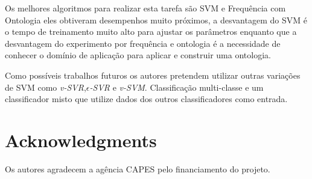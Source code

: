 \documentclass{acm_proc_article-sp}
\begin{document}
Os melhores algoritmos para realizar esta tarefa s{\~a}o SVM e Frequ{\^e}ncia com Ontologia eles obtiveram desempenhos muito pr{\'o}ximos, a desvantagem do SVM {\'e} o tempo de treinamento muito alto para ajustar os par{\^a}metros enquanto que a desvantagem do experimento por frequ{\^e}ncia e ontologia {\'e} a necessidade de conhecer o dom{\'i}nio de aplica\c{c}{\~a}o para aplicar e construir uma ontologia.

Como poss{\'i}veis trabalhos futuros os autores pretendem utilizar outras variações de SVM como \emph{v-SVR},\emph{\(\epsilon\)-SVR} e \emph{v-SVM}. Classifica\c{c}{\~a}o multi-classe e um classificador misto que utilize dados dos outros classificadores como entrada.

\section{Acknowledgments}
Os autores agradecem a ag{\^e}ncia CAPES pelo financiamento do projeto.


 

\balancecolumns
\end{document}
